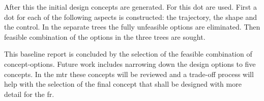 After this the initial design concepts are generated. For this \acrfull{dot} are used. First a \gls{dot} for each of the following aspects is constructed: the trajectory, the shape and the control. In the separate trees the fully unfeasible options are eliminated. Then feasible combination of the options in the three trees are sought.

This baseline report is concluded by the selection of the feasible combination of concept-options. Future work includes narrowing down the design options to five concepts. In the \acrfull{mtr} these concepts will be reviewed and a trade-off process will help with the selection of the final concept that shall be designed with more detail for the \acrfull{fr}.
